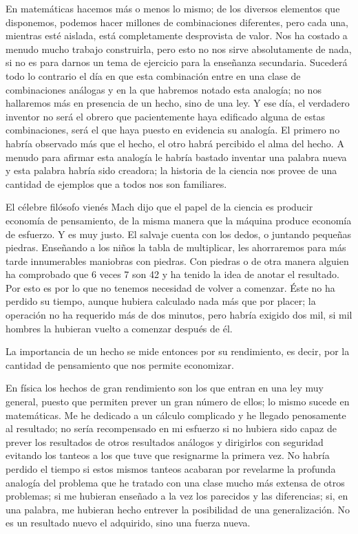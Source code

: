 \documentclass[a4paper, 12pt]{article}
\begin{document}
En matemáticas hacemos más o menos lo mismo; de los diversos
elementos que disponemos, podemos hacer millones de combinaciones
diferentes, pero cada una, mientras esté aislada, está completamente
desprovista de valor. Nos ha costado a menudo mucho trabajo construirla,
pero esto no nos sirve absolutamente de nada, si no es para darnos un tema
de ejercicio para la enseñanza secundaria. Sucederá todo lo
contrario el día en que esta combinación entre en una clase de
combinaciones análogas y en la que habremos notado esta analogía;
no nos hallaremos más en presencia de un hecho, sino de una ley. Y ese día, el verdadero inventor no será el obrero que pacientemente haya
edificado alguna de estas combinaciones, será el que haya puesto en
evidencia su analogía. El primero no habría observado más que
el hecho, el otro habrá percibido el alma del hecho. A menudo para
afirmar esta analogía le habría bastado inventar una palabra nueva
y esta palabra habría sido creadora; la historia de la ciencia nos
provee de una cantidad de ejemplos que a todos nos son familiares.



El célebre filósofo vienés Mach dijo que el papel de la ciencia
es producir economía de pensamiento, de la misma manera que la máquina produce economía de esfuerzo. Y es muy justo. El salvaje cuenta
con los dedos, o juntando pequeñas piedras. Enseñando a los niños la tabla de multiplicar, les ahorraremos para más tarde innumerables
maniobras con piedras. Con piedras o de otra manera alguien ha comprobado
que 6 veces 7 son 42 y ha tenido la idea de anotar el resultado. Por esto es
por lo que no tenemos necesidad de volver a comenzar. Éste no ha perdido su tiempo, aunque hubiera calculado nada más que
por placer; la operación no ha requerido más de dos minutos, pero
habría exigido dos mil, si mil hombres la hubieran vuelto a comenzar
después de él.

La importancia de un hecho se mide entonces por su rendimiento, es decir,
por la cantidad de pensamiento que nos permite economizar.

En física los hechos de gran rendimiento son los que entran en una ley
muy general, puesto que permiten prever un gran número de ellos; lo
mismo sucede en matemáticas. Me he dedicado a un cálculo complicado
y he llegado penosamente al resultado; no sería recompensado en mi
esfuerzo si no hubiera sido capaz de prever los resultados de otros
resultados análogos y dirigirlos con seguridad evitando los tanteos a
los que tuve que resignarme la primera vez. No habría perdido el tiempo
si estos mismos tanteos acabaran por revelarme la profunda analogía del
problema que he tratado con una clase mucho más extensa de otros
problemas; si me hubieran enseñado a la vez los parecidos y las
diferencias; si, en una palabra, me hubieran hecho entrever la posibilidad
de una generalización. No es un resultado nuevo el adquirido, sino una
fuerza nueva.
\end{document}
